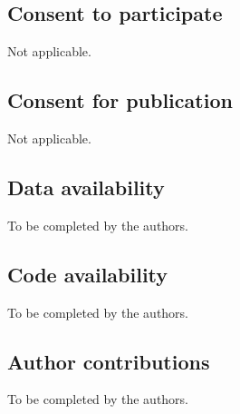 \documentclass[pdflatex,sn-basic,Numbered,iicol]{sn-jnl}
\begin{document}
\subsection*{Consent to participate}
Not applicable.

\subsection*{Consent for publication}
Not applicable.

\subsection*{Data availability}
To be completed by the authors.

\subsection*{Code availability}
To be completed by the authors.

\subsection*{Author contributions}
To be completed by the authors.


\end{document}
